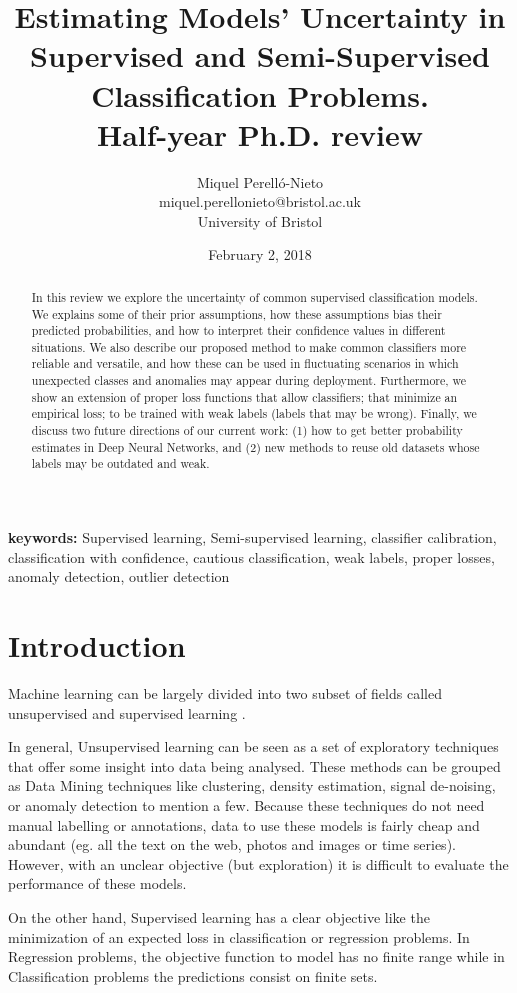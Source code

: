 \documentclass[a4paper, 12pt]{article}
\title{Estimating Models' Uncertainty in Supervised and Semi-Supervised Classification Problems. \\ Half-year Ph.D. review}
\author{Miquel Perelló-Nieto \\
miquel.perellonieto@bristol.ac.uk \\
University of Bristol}
\date{February 2, 2018}
\begin{document}
\maketitle

\begin{abstract}
In this review we explore the uncertainty of common supervised classification models.
We explains some of their prior assumptions, how these assumptions bias their predicted probabilities, and how to interpret their confidence values in different situations.
We also describe our proposed method to make common classifiers more reliable and versatile, and how these can be used in fluctuating scenarios in which unexpected classes and anomalies may appear during deployment.
Furthermore, we show an extension of proper loss functions that allow classifiers; that minimize an empirical loss; to be trained with weak labels (labels that may be wrong).
Finally, we discuss two future directions of our current work: (1) how to get better probability estimates in Deep Neural Networks, and (2) new methods to reuse old datasets whose labels may be outdated and weak.
\end{abstract}
\textbf{keywords:} Supervised learning, Semi-supervised learning, classifier calibration, classification with confidence, cautious classification, weak labels, proper losses, anomaly detection, outlier detection

\section{Introduction}

Machine learning can be largely divided into two subset of fields called unsupervised and supervised learning \cite{Bishop2006}.

In general, Unsupervised learning can be seen as a set of exploratory techniques that offer some insight into data being analysed.
These methods can be grouped as Data Mining techniques like clustering, density estimation, signal de-noising, or anomaly detection to mention a few.
Because these techniques do not need manual labelling or annotations, data to use these models is fairly cheap and abundant (eg. all the text on the web,  photos and images or time series).
However, with an unclear objective (but exploration) it is difficult to evaluate the performance of these models.

On the other hand, Supervised learning has a clear objective like the minimization of an expected loss in classification or regression problems.
In Regression problems, the objective function to model has no finite range while in Classification problems the predictions consist on finite sets.
\end{document}
